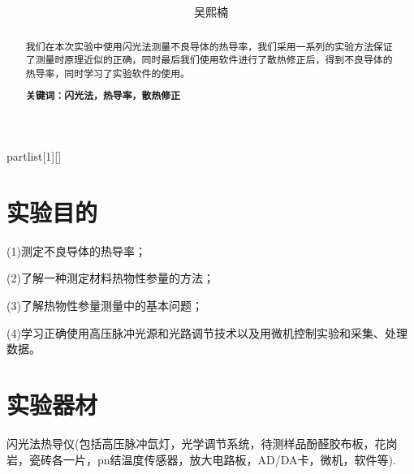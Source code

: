 \documentclass[UTF8]{ctexart}
\author{
	吴熙楠}
\title{
	\heiti{闪光法测不良导体热导率实验报告}
}
\begin{document}
	\maketitle
	\newtheorem{definition}{定义}[subsection]
	\newtheorem{function}{公式}[subsection]
	\newtheorem{summary}{小结}[subsection]
	\newtheorem{deduction}{推论}[subsection]
	\newtheorem{property}{性质}[subsection]
	\newtheorem{theo}{定理}[subsection]
	\newtheorem{step}{步骤}[subsection]
	\newtheorem{remark}{注记}[subsection]
	\newtheorem{proof}{证明}[subsection]
	\newenvironment{Theorem}[1][]{\par\noindent\textbf{定理}(#1)\quad}{\par}
	\newcommand{\rbra}[1]{\left( #1 \right)}
	\newcommand{\sbra}[1]{\left[ #1 \right]}
	\newcommand{\cbra}[1]{\left\{ #1 \right\}}
	\newcommand{\pbra}[1]{\left< #1 \right>}
	\newcommand{\abs}[1]{\left| #1 \right|}
	\newcommand{\fs}[2]{\displaystyle\frac{#1}{#2}}
	
	\newenvironment{myproof}{{\color{blue}证：}}
	
	\newenvironment{partlist}[1][]
	{\begin{enumerate}[itemsep=0pt, label=(\arabic*), wide, labelindent=\parindent, listparindent=\parindent, #1]}
		{\end{enumerate}}
	
	\renewcommand{\contentsname}{目录} %
	\tableofcontents
	\newpage
	\renewcommand{\abstractname}{\large 摘要\\}
	\begin{abstract}
		我们在本次实验中使用闪光法测量不良导体的热导率，我们采用一系列的实验方法保证了测量时原理近似的正确，同时最后我们使用软件进行了散热修正后，得到不良导体的热导率，同时学习了实验软件的使用。
		
		\textbf{关键词：闪光法，热导率，散热修正}
	\end{abstract}
	\section{实验目的}
	(1)测定不良导体的热导率；
	\par (2)了解一种测定材料热物性参量的方法；
	\par (3)了解热物性参量测量中的基本问题；
	\par (4)学习正确使用高压脉冲光源和光路调节技术以及用微机控制实验和采集、处理数据。
	\section{实验器材}
	闪光法热导仪(包括高压脉冲氙灯，光学调节系统，待测样品酚醛胶布板，花岗岩，瓷砖各一片，pn结温度传感器，放大电路板，AD/DA卡，微机，软件等).
\end{document}
